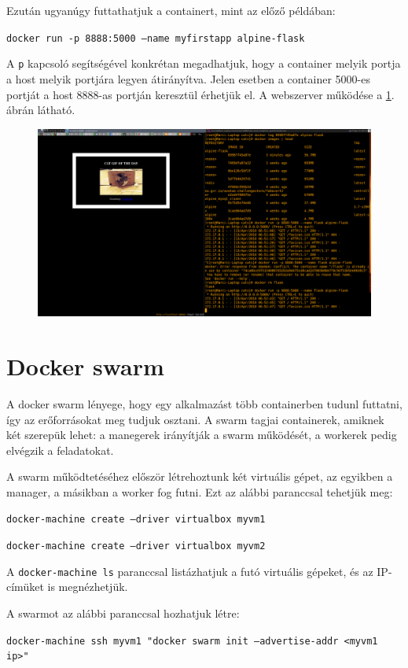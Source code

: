 \documentclass[]{article}
\numberwithin{equation}{section}
\begin{document}
\vskip10pt
Ezután ugyanúgy futtathatjuk a containert, mint az előző példában:

\texttt{docker run -p 8888:5000 --name myfirstapp alpine-flask}

A \texttt{p} kapcsoló segítségével konkrétan megadhatjuk, hogy a container melyik portja a host melyik portjára legyen átirányítva. Jelen esetben a container 5000-es portját a host 8888-as portján keresztül érhetjük el.  A webszerver működése a \ref{fig:cats}. ábrán látható.

\begin{figure}[H]
	\centering
	\includegraphics[width=0.9\linewidth]{cats}
	\caption{}
	\label{fig:cats}
\end{figure}

\section{Docker swarm}

A docker swarm lényege, hogy egy alkalmazást több containerben tudunl futtatni, így az erőforrásokat meg tudjuk osztani. A swarm tagjai containerek, amiknek két szerepük lehet: a manegerek irányítják a swarm működését, a workerek pedig elvégzik a feladatokat.

A swarm működtetéséhez először létrehoztunk két virtuális gépet, az egyikben a manager, a másikban a worker fog futni. Ezt az alábbi paranccsal tehetjük meg:

\texttt{docker-machine create --driver virtualbox myvm1}

\texttt{docker-machine create --driver virtualbox myvm2}

A \texttt{docker-machine ls} paranccsal listázhatjuk a futó virtuális gépeket, és az IP-címüket is megnézhetjük.

A swarmot az alábbi paranccsal hozhatjuk létre:

\texttt{docker-machine ssh myvm1 "docker swarm init --advertise-addr <myvm1 ip>"}
\end{document}
